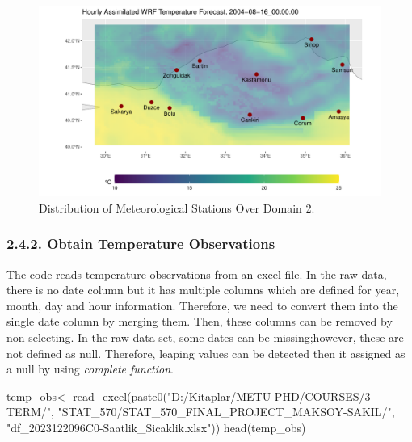 \documentclass[
  letterpaper,
  DIV=11,
  numbers=noendperiod,
  abstract]{scrartcl}
\newenvironment{Shaded}{\begin{snugshade}}{\end{snugshade}}
\newcommand{\FunctionTok}[1]{\textcolor[rgb]{0.28,0.35,0.67}{#1}}
\newcommand{\NormalTok}[1]{\textcolor[rgb]{0.00,0.23,0.31}{#1}}
\newcommand{\OtherTok}[1]{\textcolor[rgb]{0.00,0.23,0.31}{#1}}
\newcommand{\StringTok}[1]{\textcolor[rgb]{0.13,0.47,0.30}{#1}}
\begin{document}
\begin{figure}[H]

{\centering \includegraphics{WRF_pdf_files/figure-pdf/fig-gauges-1.pdf}

}

\caption{\label{fig-gauges}Distribution of Meteorological Stations Over
Domain 2.}

\end{figure}

\hypertarget{obtain-temperature-observations}{%
\subsubsection{2.4.2. Obtain Temperature
Observations}\label{obtain-temperature-observations}}

The code reads temperature observations from an excel file. In the raw
data, there is no date column but it has multiple columns which are
defined for year, month, day and hour information. Therefore, we need to
convert them into the single date column by merging them. Then, these
columns can be removed by non-selecting. In the raw data set, some dates
can be missing;however, these are not defined as null. Therefore,
leaping values can be detected then it assigned as a null by using
\emph{complete function}.

\begin{Shaded}
\begin{Highlighting}[]
\NormalTok{temp\_obs}\OtherTok{\textless{}{-}} \FunctionTok{read\_excel}\NormalTok{(}\FunctionTok{paste0}\NormalTok{(}\StringTok{"D:/Kitaplar/METU{-}PHD/COURSES/3{-}TERM/"}\NormalTok{,}
\StringTok{"STAT\_570/STAT\_570\_FINAL\_PROJECT\_MAKSOY{-}SAKIL/"}\NormalTok{,}
\StringTok{"df\_2023122096C0{-}Saatlik\_Sicaklik.xlsx"}\NormalTok{))}
\FunctionTok{head}\NormalTok{(temp\_obs)}
\end{Highlighting}
\end{Shaded}
\end{document}
